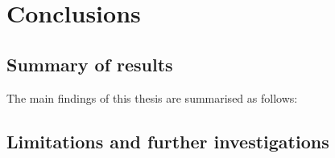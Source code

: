 \chapter{Conclusions}
\label{cha:conclusions}

\section{Summary of results}

The main findings of this thesis are summarised as follows:

\section{Limitations and further investigations}



